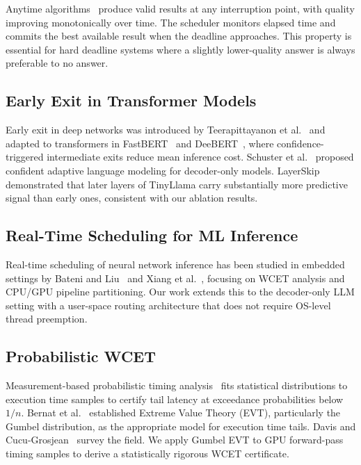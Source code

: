 \documentclass[conference]{IEEEtran}
\begin{document}
Anytime algorithms~\cite{zilberstein1996using,boddy1994deliberation}
produce valid results at any interruption point, with quality
improving monotonically over time.
The scheduler monitors elapsed time and commits the best available
result when the deadline approaches.
This property is essential for hard deadline systems where a slightly
lower-quality answer is always preferable to no answer.

\subsection{Early Exit in Transformer Models}

Early exit in deep networks was introduced by
Teerapittayanon et al.~\cite{teerapittayanon2016branchynet} and
adapted to transformers in FastBERT~\cite{liu2020fastbert} and
DeeBERT~\cite{xin2020deebert}, where confidence-triggered intermediate
exits reduce mean inference cost.
Schuster et al.~\cite{schuster2022confident} proposed confident
adaptive language modeling for decoder-only models.
LayerSkip~\cite{elhoushi2024layerskip} demonstrated that later layers
of TinyLlama carry substantially more predictive signal than early ones,
consistent with our ablation results.

\subsection{Real-Time Scheduling for ML Inference}

Real-time scheduling of neural network inference has been studied in
embedded settings by Bateni and Liu~\cite{bateni2020neuos} and
Xiang et al.~\cite{xiang2019pipelined}, focusing on WCET analysis and
CPU/GPU pipeline partitioning.
Our work extends this to the decoder-only LLM setting with a
user-space routing architecture that does not require OS-level thread
preemption.

\subsection{Probabilistic WCET}

Measurement-based probabilistic timing analysis~\cite{cucu2012measurement}
fits statistical distributions to execution time samples to certify
tail latency at exceedance probabilities below $1/n$.
Bernat et al.~\cite{bernat2002wcet} established Extreme Value Theory
(EVT), particularly the Gumbel distribution, as the appropriate model
for execution time tails.
Davis and Cucu-Grosjean~\cite{davis2013quantifying} survey the field.
We apply Gumbel EVT to GPU forward-pass timing samples to derive
a statistically rigorous WCET certificate.
\end{document}
